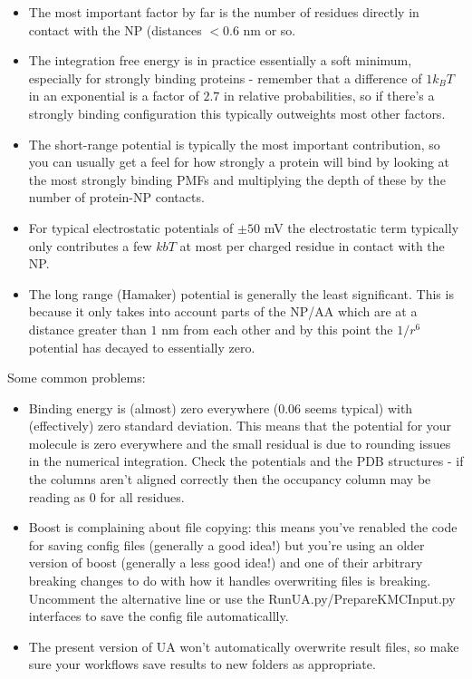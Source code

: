 \documentclass[10pt,a4paper,onecolumn]{report}
\begin{document}
\begin{itemize}
\item The most important factor by far is the number of residues directly in contact with the NP (distances $< 0.6 $ nm or so. 
\item The integration free energy is in practice essentially a soft minimum, especially for strongly binding proteins - remember that a difference of $1 k_BT$ in an exponential is a factor of $2.7$ in relative probabilities, so if there's a strongly binding configuration this typically outweights most other factors.
\item The short-range potential is typically the most important contribution, so you can usually get a feel for how strongly a protein will bind by looking at the most strongly binding PMFs and multiplying the depth of these by the number of protein-NP contacts. 
\item For typical electrostatic potentials of $\pm 50$ mV the electrostatic term typically only contributes a few $kbT$ at most per charged residue in contact with the NP. 
\item The long range (Hamaker) potential is generally the least significant. This is because it only takes into account parts of the NP/AA which are at a distance greater than $1$ nm from each other and by this point the $1/r^6$ potential has decayed to essentially zero. 
\end{itemize}


Some common problems:
\begin{itemize}
\item Binding energy is (almost) zero everywhere (0.06 seems typical) with (effectively) zero standard deviation. This means that the potential for your molecule is zero everywhere and the small residual is due to rounding issues in the numerical integration. Check the potentials and the PDB structures - if the columns aren't aligned correctly then the occupancy column may be reading as 0 for all residues.
\item Boost is complaining about file copying: this means you've renabled the code for saving config files (generally a good idea!) but you're using an older version of boost (generally a less good idea!) and one of their arbitrary breaking changes to do with how it handles overwriting files is breaking. Uncomment the alternative line or use the RunUA.py/PrepareKMCInput.py interfaces to save the config file automaticallly. 
\item The present version of UA won't automatically overwrite result files, so make sure your workflows save results to new folders as appropriate.
\end{itemize}
\end{document}

